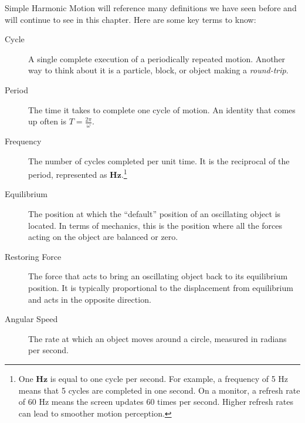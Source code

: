   Simple
Harmonic Motion will reference many definitions we have seen before and will
continue to see in this chapter. Here are some key terms to know:
\begin{description}
	\item[Cycle] A single complete execution of a periodically repeated motion.
		Another way to think about it is a particle, block, or object making a \emph{round-trip}.

	\item[Period] The time it takes to complete one cycle of motion. An identity
		that comes up often is $T= \frac{2\pi}{\omega}$.

	\item[Frequency] The number of cycles completed per unit time. It is the
		reciprocal of the period, represented as $\mathbf{Hz}$.\footnote{One
		$\mathbf{Hz}$ is equal to one cycle per second. For example, a frequency of
		5 Hz means that 5 cycles are completed in one second. On a monitor, a
		refresh rate of 60 Hz means the screen updates 60 times per second. Higher refresh
		rates can lead to smoother motion perception.}

	\item[Equilibrium] The position at which the ``default'' position of an oscillating
		object is located. In terms of mechanics, this is the position where all the forces
		acting on the object are balanced or zero.

	\item[Restoring Force] The force that acts to bring an oscillating object back to
		its equilibrium position. It is typically proportional to the displacement
		from equilibrium and acts in the opposite direction.

	\item[Angular Speed] The rate at which an object moves around a circle,
		measured in radians per second.
\end{description}


